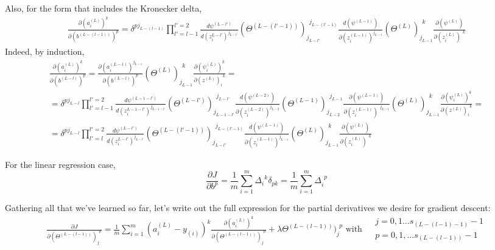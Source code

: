 \documentclass[10pt]{amsart}
\begin{document}
\begin{multicols*}{2}
Also, for the form that includes the Kronecker delta, 
\begin{equation}
\begin{gathered}
\boxed{ \frac{ \partial (a_i^{(L)})^k }{ \partial (b^{(L-(l-1))})^p} = \delta^{pj_{L-(l-1)}} \prod_{l'=l-1}^{l'=2} \frac{d\psi^{(L-l')}}{ d(z_i^{L-l'})^{j_{L-l'}} } (\Theta^{(L-(l'-1))})_{j_{L-l'}}^{\  \  j_{L-(l'-1)}}  \frac{ d ( \psi^{(L-1)}) }{ \partial (z_i^{(L-1)})^{  j_{L-1} } }  ( \Theta^{(L)})_{ j_{L-1} }^{\  \  k} \frac{ \partial ( \psi^{(L)}) }{ \partial (z_i^{(L)})^{\  \  k } }     }
\end{gathered}
\end{equation}
Indeed, by induction, 
\[
\begin{gathered}
\frac{ \partial (a_i^{(L)})^k }{ \partial (b^{(L-l)})^p } = \frac{ \partial ( a_i^{(L-1)})^{ j_{L-1} } }{ \partial (b^{(L-l)})^{    p } }  ( \Theta^{(L)})_{ j_{L-1} }^{\  \  k} \frac{ \partial ( \psi_i^{(L)})^{ k } }{ \partial (z^{(L)})_i^{\  \  k } }   = \\ 
= \delta^{pj_{L-l}} \prod_{l'=l-1}^{l'=2} \frac{d\psi^{(L-1-l')}}{ d(z_i^{L-1-l'})^{j_{L-1-l'}} } (\Theta^{(L-l')})_{j_{L-1-l'}}^{\  \  j_{L-l'}}  \frac{ d ( \psi^{(L-2)}) }{ \partial (z_i^{(L-2)})^{  j_{L-2} } }  ( \Theta^{(L-1)})_{ j_{L-2} }^{\  \  j_{L-1}} \frac{ \partial ( \psi^{(L-1)}) }{ \partial (z_i^{(L-1)})^{\  \  j_{L-1} } } ( \Theta^{(L)})_{ j_{L-1} }^{\  \  k} \frac{ \partial ( \psi_i^{(L)})^{ k } }{ \partial (z^{(L)})_i^{\  \  k } }  = \\
= \delta^{pj_{L-l}} \prod_{l'=l}^{l'=2} \frac{d\psi^{(L-l')}}{ d(z_i^{L-l'})^{j_{L-l'}} } (\Theta^{(L-(l'-1))})_{j_{L-l'}}^{\  \  j_{L-(l'-1)}}  \frac{ d ( \psi^{(L-1)}) }{ \partial (z_i^{(L-1)})^{  j_{L-1} } }  ( \Theta^{(L)})_{ j_{L-1} }^{\  \  k} \frac{ \partial ( \psi^{(L)}) }{ \partial (z_i^{(L)})^{\  \  k } } 
\end{gathered} \]

For the linear regression case, 
\[
\frac{ \partial J}{ \partial b^p} = \frac{1}{m} \sum_{i=1}^m \Delta_i^{\  \  k } \delta_{pk} = \frac{1}{m} \sum_{i=1}^m \Delta_i^{\  \  p}
\]


Gathering all that we've learned so far, let's write out the full expression for the partial derivatives we desire for gradient descent:  
\begin{equation}
\boxed{ 
	\begin{gathered}
	\frac{ \partial J }{ \partial ( \Theta^{(L-(l-1))})_j^{\  \  p} } = \frac{1}{m} \sum_{i=1}^m (a_i^{(L)} - y_{(i)})^k \frac{ \partial (a_i^{(L)})^k }{ \partial (\Theta^{(L-(l-1))})_j^{\  \  p} } + \lambda  \Theta^{(L-(l-1))})_j^{\  \  p} \text{ with } \begin{aligned} & j = 0,1\dots s_{(L-(l-1)-1)}-1 \\ & p = 0,1,\dots s_{(L-(l-1))} -1 \end{aligned}
	\end{gathered}	
}
\end{equation}

\end{multicols*}
\end{document}
